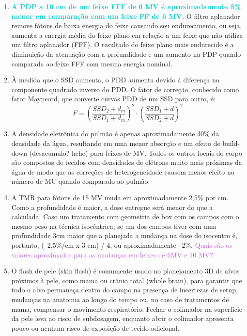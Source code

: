 \documentclass[11pt,a4paper]{article}
\begin{document}
\begin{enumerate}
        \item \textcolor{DarkTurquoise}{\textbf{A PDP a 10 cm de um feixe FFF de 6 MV é aproximadamente 3\% menor em comparação com um feixe FF de 6 MV.}} O filtro aplanador remove fótons de baixa energia do feixe causando seu endurecimento, ou seja, aumenta a energia média do feixe plano em relação a um feixe que não utiliza um filtro aplanador (FFF). O resultado do feixe plano mais endurecido é a diminuição da atenuação com a profundidade e um aumento na PDP quando comparada ao feixe FFF com mesma energia nominal.

        \item À medida que o SSD aumenta, o PDD aumenta devido à diferença no componente quadrado inverso do PDD. O fator de correção, conhecido como fator Mayneord, que converte curvas PDD de um SSD para outro, é: $$F = \left(\frac{SSD_2 + d_m}{SSD_1 + d_m}\right)^2 \cdot \left(\frac{SSD_1 + d}{SSD_2 + d}\right)^2$$ 

        \item A densidade eletrônica do pulmão é apenas aproximadamente 30\% da densidade da água, resultando em uma menor absorção e um efeito de build-down (desacumulo? hehe) para feixes de MV. Todos os outros locais do corpo são compostos de tecidos com densidades de elétrons muito mais próximas da água de modo que as correções de heterogeneidade causem menos efeito no número de MU quando comparado ao pulmão.

        \item A TMR para fótons de 15 MV muda em aproximadamente 2,5\% por cm. Como a profundidade é maior, a dose entregue será menor do que a calculada. Caso um tratamento com geometria de box com os campos com o mesmo peso na técnica isocêntrica; se um dos campos tiver com uma profundidade 3cm maior que a planejada a mudança na dose do isocentro é, portanto, (–2,5\%/cm x 3 cm) / 4, ou aproximadamente –2\%. \textcolor{MediumOrchid}{Quais são os valores aproximados para as mudanças em feixes de 6MV e 10 MV?}

        \item O flash de pele (skin flash) é comumente usado no planejamento 3D de alvos próximos à pele, como mama ou crânio total (whole brain), para garantir que todo o alvo permaneça dentro do campo na presença de incertezas de setup, mudanças na anatomia ao longo do tempo ou, no caso de tratamentos de mama, compensar o movimento respiratório. Fechar o colimador na superfície da pele leva ao risco de subdosagem, enquanto abrir o colimador apresenta pouco ou nenhum risco de exposição de tecido adicional.


\end{enumerate}
\end{document}
